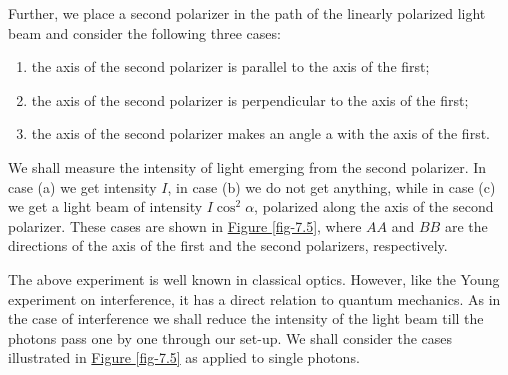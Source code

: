 \documentclass[a4paper,sfsidenotes,colorlinks=true]{tufte-book}
\numberwithin{equation}{section}
\numberwithin{figure}{section}
\begin{document}
Further, we place a second polarizer in the path of the linearly polarized light beam and consider the following three cases: 
\begin{enumerate}[label=(\alph*), leftmargin=1cm]
\item the axis of the second polarizer is parallel to the axis of the first; 
\item the axis of the second polarizer is perpendicular to the axis of the first; 
\item the axis of the second polarizer makes an angle a with the axis of the first. 
\end{enumerate}

We shall measure the intensity of light emerging from the second polarizer. In case (a) we get intensity $I$, in case (b) we do not get anything, while in case (c) we get a light beam of intensity $I \cos^{2} \alpha $, polarized along the axis of the second polarizer. These cases are shown in \hyperref[fig-7.5]{Figure \ref{fig-7.5}}, where $AA$ and $BB$ are the directions of the axis of the first and the second polarizers, respectively. 


The above experiment is well known in classical optics. However, like the Young experiment on interference, it has a direct relation to quantum mechanics. As in the case of interference we shall reduce the intensity of the light beam till the photons pass one by one through our set-up. We shall consider the cases illustrated in \hyperref[fig-7.5]{Figure \ref{fig-7.5}} as applied to single photons. 
\end{document}
